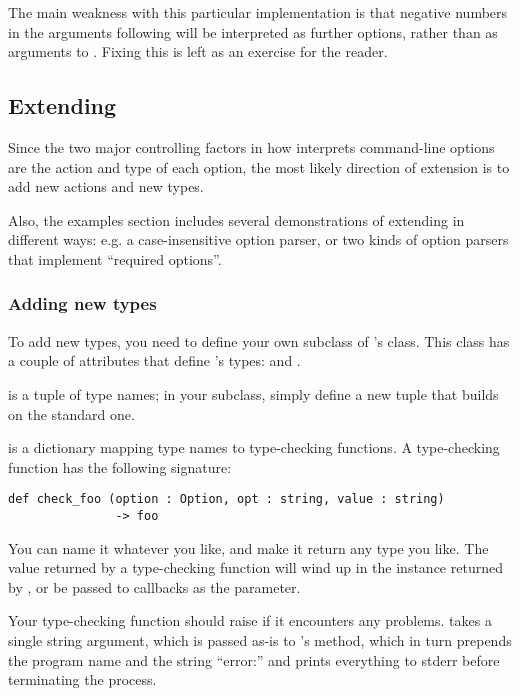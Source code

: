 The main weakness with this particular implementation is that negative
numbers in the arguments following  will be interpreted
as further options, rather than as arguments to .
Fixing this is left as an exercise for the reader.

\subsection{Extending \label{optparse-extending}}

Since the two major controlling factors in how 
interprets command-line options are the action and type of each
option, the most likely direction of extension is to add new actions
and new types.

Also, the examples section includes several demonstrations of
extending  in different ways: e.g. a case-insensitive
option parser, or two kinds of option parsers that implement
``required options''.

\subsubsection{Adding new types\label{optparse-adding-types}}

To add new types, you need to define your own subclass of
's  class.  This class has a couple of
attributes that define 's types:  and
.

 is a tuple of type names; in your subclass, simply
define a new tuple  that builds on the standard one.

 is a dictionary mapping type names to
type-checking functions.  A type-checking function has the following
signature:

\begin{verbatim}
def check_foo (option : Option, opt : string, value : string)
               -> foo
\end{verbatim}

You can name it whatever you like, and make it return any type you
like.  The value returned by a type-checking function will wind up in
the  instance returned by
, or be passed to callbacks as the
 parameter.

Your type-checking function should raise 
if it encounters any problems.   takes a
single string argument, which is passed as-is to
's  method, which in turn prepends
the program name and the string ``error:'' and prints everything to
stderr before terminating the process.

